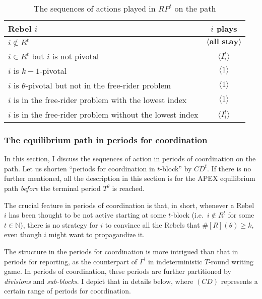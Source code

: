 \documentclass[12pt,letter]{article}
\theoremstyle{definition}
\theoremstyle{remark}
\theoremstyle{claim}
\begin{document}
\begin{table}[!htbp]
\caption{The sequences of actions played in $RP^t$ on the path}
\label{Table_msg_RP_path}
\begin{center}
\begin{tabular}{l c}
Rebel $i$ & $i$ plays\\
\hline
\hline
$i\notin R^t$				& $\langle \textbf{all stay} \rangle$  \\
$i\in R^t$ but $i$ is not pivotal	 					 			& $\langle I^t_i \rangle$  \\
$i$ is $k-1$-pivotal	 					 			& $\langle 1 \rangle$  \\
$i$ is $\theta$-pivotal but not in the free-rider problem	 					 			& $\langle 1 \rangle$  \\
$i$ is in the free-rider problem with the lowest index	 					 			& $\langle 1 \rangle$  \\
$i$ is in the free-rider problem without the lowest index	 					 			& $\langle I^t_i \rangle$  \\
\hline
\end{tabular}
\end{center}
\end{table}


\subsubsection{The equilibrium path in periods for coordination}
\label{sec:eq_cd}
In this section, I discuss the sequences of action in periods of coordination on the path. Let us shorten ``periods for coordination  in $t$-block'' by $CD^{t}$. If there is no further mentioned, all the description in this section is for the APEX equilibrium path \textit{before} the terminal period $T^{\theta}$ is reached. 

The crucial feature in periods of coordination is that, in short, whenever a Rebel $i$ has been thought to be not active starting at some $t$-block (i.e.~$i\notin R^t$ for some $t\in \mathbb{N}$), there is no strategy for $i$ to convince all the Rebels that $\#[R](\theta)\geq k$, even though $i$ might want to propagandize it.

The structure in the periods for coordination is more intrigued than that in periods for reporting, as the counterpart of $\Gamma^{'}$ in indeterministic $T$-round writing game. In periods of coordination, these periods are further partitioned by \textit{divisions} and \textit{sub-blocks}. I depict that in details below, where $(CD)$ represents a certain range of periods for coordination. 
\end{document}
